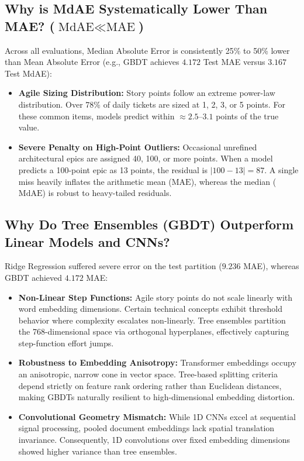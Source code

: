 \documentclass[11pt,a4paper]{article}
\begin{document}
\subsection{Why is MdAE Systematically Lower Than MAE? ($\text{MdAE} \ll \text{MAE}$)}
Across all evaluations, Median Absolute Error is consistently 25\% to 50\% lower than Mean Absolute Error (e.g., GBDT achieves $4.172$ Test MAE versus $3.167$ Test MdAE):
\begin{itemize}
    \item \textbf{Agile Sizing Distribution:} Story points follow an extreme power-law distribution. Over 78\% of daily tickets are sized at 1, 2, 3, or 5 points. For these common items, models predict within $\approx 2.5$--$3.1$ points of the true value.
    \item \textbf{Severe Penalty on High-Point Outliers:} Occasional unrefined architectural epics are assigned 40, 100, or more points. When a model predicts a 100-point epic as 13 points, the residual is $|100 - 13| = 87$. A single miss heavily inflates the arithmetic mean ($\text{MAE}$), whereas the median ($\text{MdAE}$) is robust to heavy-tailed residuals.
\end{itemize}

\subsection{Why Do Tree Ensembles (GBDT) Outperform Linear Models and CNNs?}
Ridge Regression suffered severe error on the test partition ($9.236$ MAE), whereas GBDT achieved $4.172$ MAE:
\begin{itemize}
    \item \textbf{Non-Linear Step Functions:} Agile story points do not scale linearly with word embedding dimensions. Certain technical concepts exhibit threshold behavior where complexity escalates non-linearly. Tree ensembles partition the 768-dimensional space via orthogonal hyperplanes, effectively capturing step-function effort jumps.
    \item \textbf{Robustness to Embedding Anisotropy:} Transformer embeddings occupy an anisotropic, narrow cone in vector space. Tree-based splitting criteria depend strictly on feature rank ordering rather than Euclidean distances, making GBDTs naturally resilient to high-dimensional embedding distortion.
    \item \textbf{Convolutional Geometry Mismatch:} While 1D CNNs excel at sequential signal processing, pooled document embeddings lack spatial translation invariance. Consequently, 1D convolutions over fixed embedding dimensions showed higher variance than tree ensembles.
\end{itemize}
\end{document}
